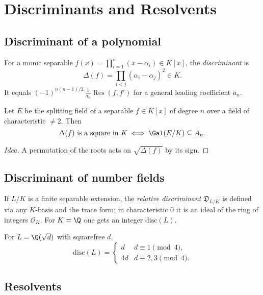 \section{Discriminants and Resolvents}

\subsection{Discriminant of a polynomial}

\begin{definition}
For a monic separable $f(x)=\prod_{i=1}^n (x-\alpha_i)\in K[x]$, the \emph{discriminant} is
\[
\Delta(f)=\prod_{i<j}(\alpha_i-\alpha_j)^2\in K.
\]
It equals $(-1)^{n(n-1)/2}\, \frac{1}{a_n}\operatorname{Res}(f,f')$ for a general leading coefficient $a_n$.
\end{definition}

\begin{proposition}
Let $E$ be the splitting field of a separable $f\in K[x]$ of degree $n$ over a field of characteristic $\neq 2$. Then
\[
\Delta(f)\text{ is a square in }K \iff \Gal(E/K)\subseteq A_n.
\]
\end{proposition}
\begin{proof}[Idea]
A permutation of the roots acts on $\sqrt{\Delta(f)}$ by its sign.
\end{proof}

\subsection{Discriminant of number fields}
\begin{definition}
If $L/K$ is a finite separable extension, the \emph{relative discriminant} $\mathfrak{D}_{L/K}$ is defined via any $K$-basis and the trace form; in characteristic $0$ it is an ideal of the ring of integers $\mathcal{O}_K$. For $K=\Q$ one gets an integer $\mathrm{disc}(L)$.
\end{definition}

\begin{example}
For $L=\Q(\sqrt{d})$ with squarefree $d$,
\[
\mathrm{disc}(L)=
\begin{cases}
d & d\equiv 1\pmod 4,\\
4d & d\equiv 2,3\pmod 4.
\end{cases}
\]
\end{example}

\subsection{Resolvents}

